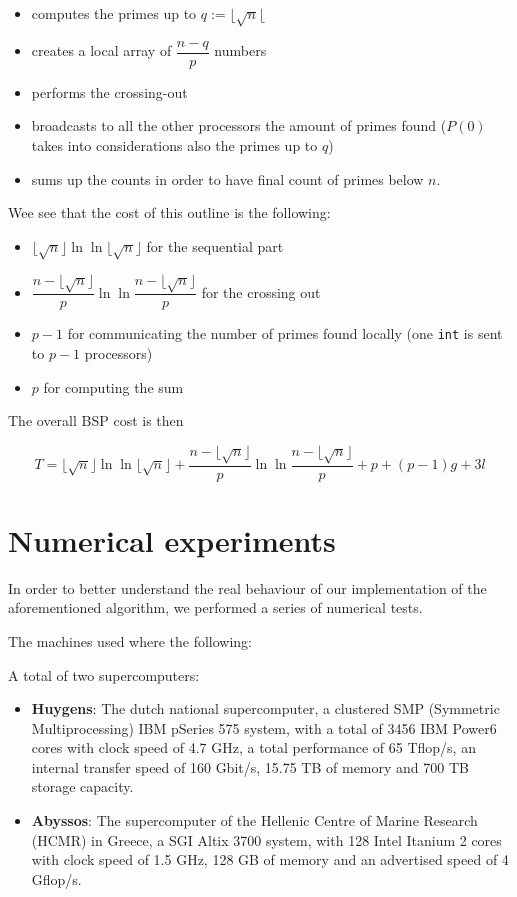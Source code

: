 \documentclass[a4paper,11pt]{article}
\begin{document}
\begin{itemize}
\item computes the primes up to $q := \lfloor \sqrt{n} \lfloor$
\item creates a local array of $\dfrac{n -q}{p}$ numbers
\item performs the crossing-out
\item broadcasts to all the other processors the amount of primes found ($P(0)$ takes into considerations also the primes up to $q$)
\item sums up the counts in order to have final count of primes below $n$.
\end{itemize}

Wee see that the cost of this outline is the following:

\begin{itemize}
\item $\lfloor \sqrt{n} \rfloor \ln \ln \lfloor \sqrt{n} \rfloor$ for the sequential part
\item $\dfrac{n-\lfloor \sqrt{n} \rfloor}{p} \ln \ln \dfrac{n-\lfloor \sqrt{n} \rfloor}{p}$ for the crossing out
\item $p-1$ for communicating the number of primes found locally (one \verb|int| is sent to $p-1$ processors)
\item $p$ for computing the sum
\end{itemize}

The overall BSP cost is then

$$T = \lfloor \sqrt{n} \rfloor \ln \ln \lfloor \sqrt{n} \rfloor + \dfrac{n-\lfloor \sqrt{n} \rfloor}{p} \ln \ln \dfrac{n-\lfloor \sqrt{n} \rfloor}{p} + p + (p-1)g + 3l$$

\section{Numerical experiments}

In order to better understand the real behaviour of our implementation of the aforementioned algorithm, we performed a series of numerical tests.

The machines used where the following:

A total of two supercomputers:

\begin{itemize}
\item \textbf{Huygens}: The dutch national supercomputer, a clustered SMP (Symmetric Multiprocessing) IBM pSeries 575 system, with a total of 3456 IBM Power6 cores with clock speed of 4.7 GHz, a total performance of 65 Tflop/s, an internal transfer speed of 160 Gbit/s, 15.75 TB of memory and 700 TB storage capacity.
\item \textbf{Abyssos}: The supercomputer of the Hellenic Centre of Marine Research (HCMR) in Greece, a SGI Altix 3700 system, with 128 Intel Itanium 2 cores with clock speed of 1.5 GHz, 128 GB of memory and an advertised speed of 4 Gflop/s.
\end{itemize}
\end{document}
